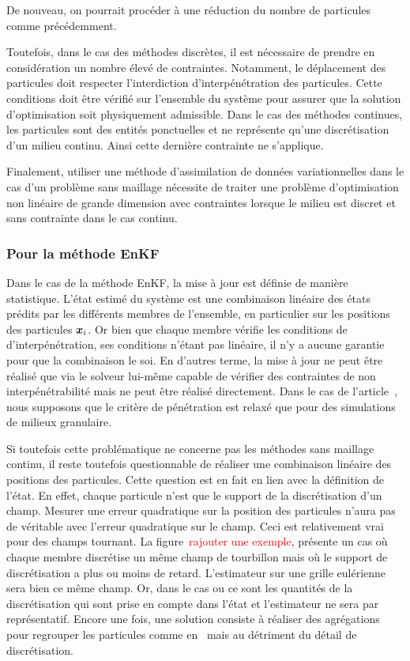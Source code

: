 De nouveau, on pourrait procéder à une réduction du nombre de particules comme précédemment.

Toutefois, dans le cas des méthodes discrètes, il est nécessaire de prendre en considération un nombre élevé de contraintes. Notamment, le déplacement des particules doit respecter l'interdiction d'interpénétration des particules. Cette conditions doit être vérifié sur l'ensemble du système pour assurer que la solution d'optimisation soit physiquement admissible. Dans le cas des méthodes continues, les particules sont des entités ponctuelles et ne représente qu'une discrétisation d'un milieu continu. Ainsi cette dernière contrainte ne s'applique.

Finalement, utiliser une méthode d'assimilation de données variationnelles dans le cas d'un problème sans maillage nécessite de traiter une problème d'optimisation non linéaire de grande dimension avec contraintes lorsque le milieu est discret et sans contrainte dans le cas continu.

\subsubsection{Pour la méthode EnKF}

Dans le cas de la méthode EnKF, la mise à jour est définie de manière statistique. L'état estimé du système est une combinaison linéaire des états prédits par les différents membres de l'ensemble, en particulier sur les positions des particules $\bm{x}_i$. Or bien que chaque membre vérifie les conditions de d'interpénétration, ses conditions n'étant pas linéaire, il n'y a aucune garantie pour que la combinaison le soi.
En d'autres terme, la mise à jour ne peut être réalisé que via le solveur lui-même capable de vérifier des contraintes de non interpénétrabilité mais ne peut être réalisé directement. Dans le cas de l'article~\cite{chen_superfloe_2022}, nous supposons que le critère de pénétration est relaxé que pour des simulations de milieux granulaire.

Si toutefois cette problématique ne concerne pas les méthodes sans maillage continu, il reste toutefois questionnable de réaliser une combinaison linéaire des positions des particules. Cette question est en fait en lien avec la définition de l'état.
En effet, chaque particule n'est que le support de la discrétisation d'un champ. Mesurer une erreur quadratique sur la position des particules n'aura pas de véritable avec l'erreur quadratique sur le champ.
Ceci est relativement vrai pour des champs tournant. La figure~\textcolor{red}{rajouter une exemple}, présente un cas où chaque membre discrétise un même champ de tourbillon mais où le support de discrétisation a plus ou moins de retard. L'estimateur sur une grille eulérienne sera bien ce même champ. Or, dans le cas ou ce sont les quantités de la discrétisation qui sont prise en compte dans l'état et l'estimateur ne sera par représentatif.
Encore une fois, une solution consiste à réaliser des agrégations pour regrouper les particules comme en~\cite{chen_superfloe_2022,darakananda_data-assimilated_2018} mais au détriment du détail de discrétisation.

